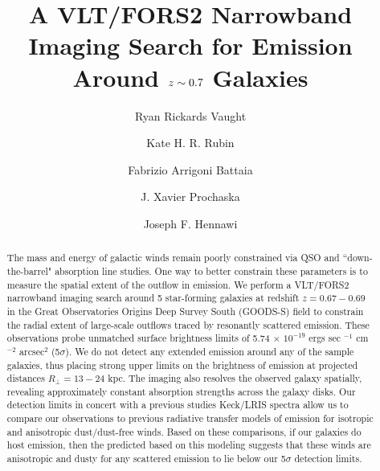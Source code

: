 \documentclass[twocolumn]{aastex61}
\begin{document}
\title{A VLT/FORS2 Narrowband Imaging Search for  Emission Around $\lowercase{z}\sim0.7$ Galaxies }
\author{Ryan Rickards Vaught}
 
 \author{Kate H. R. Rubin }
 
 \author{Fabrizio Arrigoni Battaia }

 \author{J. Xavier Prochaska}
 
\author{Joseph F. Hennawi}


\begin{abstract}

The mass and energy of galactic winds remain poorly constrained via QSO and ``down-the-barrel" absorption line studies. One way to better constrain these parameters is to measure the spatial extent of the outflow in emission. We perform a VLT/FORS2 narrowband imaging search around 5 star-forming galaxies at redshift $z=0.67-0.69$ in the Great Observatories Origins Deep Survey South (GOODS-S) field to constrain the radial extent of large-scale outflows traced by resonantly scattered  emission. These observations probe unmatched surface brightness limits of 5.74 $\times$ $10^{-19}$ ergs sec $^{-1}$ cm$^{-2}$ arcsec$^2$ (5$\sigma$).  We do not detect any extended emission around any of the sample galaxies, thus placing strong upper limits on the brightness of  emission at projected distances $R_{\perp} = 13-24$ kpc. The imaging also resolves the  observed galaxy spatially, revealing approximately constant absorption strengths across the galaxy disks. Our detection limits in concert with a previous studies Keck/LRIS spectra allow us to compare our observations to previous radiative transfer models of  emission for isotropic and anisotropic dust/dust-free winds. Based on these comparisons, if our galaxies do host  emission, then the predicted  based on this modeling suggests that these winds are anisotropic and dusty for any scattered  emission to lie below our 5$\sigma$ detection limits.

\end{abstract}
\end{document}
